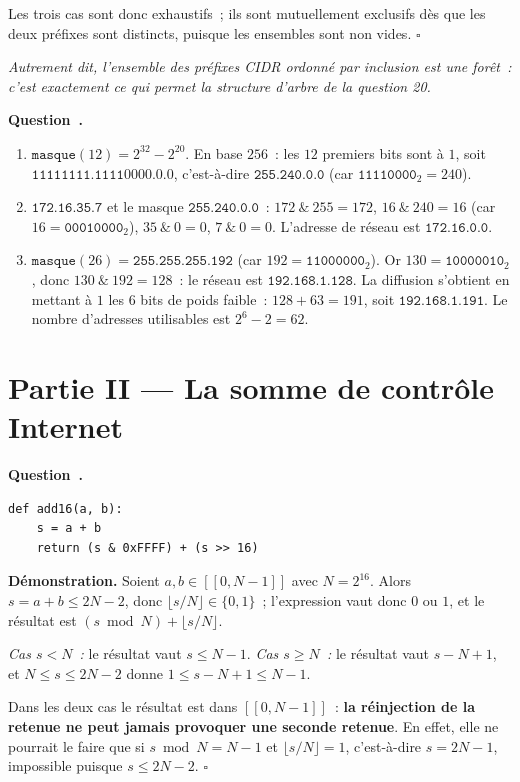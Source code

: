 \documentclass[11pt,a4paper]{article}
\renewcommand{\Q}{\medskip\par\stepcounter{qcnt}\noindent\textbf{\color{cnc}Question~\theqcnt.}~}
\begin{document}
Les trois cas sont donc exhaustifs~; ils sont mutuellement exclusifs dès que les deux
préfixes sont distincts, puisque les ensembles sont non vides. \hfill$\square$

\emph{Autrement dit, l'ensemble des préfixes CIDR ordonné par inclusion est une forêt~: c'est
exactement ce qui permet la structure d'arbre de la question 20.}

\Q
\begin{enumerate}[label=(\alph*),leftmargin=2em,itemsep=2pt]
\item $\texttt{masque}(12)=2^{32}-2^{20}$. En base $256$~: les $12$ premiers bits sont à $1$,
soit $\texttt{11111111.1111}0000.0.0$, c'est-à-dire
$\boxed{\texttt{255.240.0.0}}$ (car $\texttt{11110000}_2=240$).
\item $\texttt{172.16.35.7}$ et le masque $\texttt{255.240.0.0}$~: $172\ \&\ 255=172$,
$16\ \&\ 240 = 16$ (car $16=\texttt{00010000}_2$), $35\ \&\ 0=0$, $7\ \&\ 0=0$. L'adresse de
réseau est $\boxed{\texttt{172.16.0.0}}$.
\item $\texttt{masque}(26)=\texttt{255.255.255.192}$ (car $192=\texttt{11000000}_2$). Or
$130=\texttt{10000010}_2$, donc $130\ \&\ 192 = 128$~: le réseau est
$\boxed{\texttt{192.168.1.128}}$. La diffusion s'obtient en mettant à $1$ les $6$ bits de
poids faible~: $128+63=191$, soit $\boxed{\texttt{192.168.1.191}}$. Le nombre d'adresses
utilisables est $2^{6}-2=\boxed{62}$.
\end{enumerate}

\section*{Partie II --- La somme de contrôle Internet}

\Q
\begin{lstlisting}
def add16(a, b):
    s = a + b
    return (s & 0xFFFF) + (s >> 16)
\end{lstlisting}
\textbf{Démonstration.} Soient $a,b\in[\![0,N-1]\!]$ avec $N=2^{16}$. Alors
$s=a+b\le 2N-2$, donc $\lfloor s/N\rfloor\in\{0,1\}$~; l'expression  vaut
donc $0$ ou $1$, et le résultat est $(s\bmod N)+\lfloor s/N\rfloor$.

\emph{Cas $s<N$~:} le résultat vaut $s\le N-1$.
\emph{Cas $s\ge N$~:} le résultat vaut $s-N+1$, et $N\le s\le 2N-2$ donne
$1\le s-N+1\le N-1$.

Dans les deux cas le résultat est dans $[\![0,N-1]\!]$~: \textbf{la réinjection de la retenue
ne peut jamais provoquer une seconde retenue}. En effet, elle ne pourrait le faire que si
$s\bmod N=N-1$ et $\lfloor s/N\rfloor=1$, c'est-à-dire $s=2N-1$, impossible puisque
$s\le 2N-2$. \hfill$\square$
\end{document}
